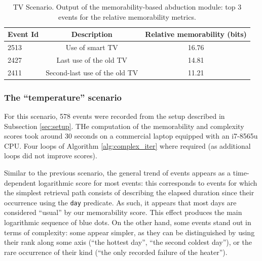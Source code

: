\documentclass[entropy,article,submit,moreauthors,pdftex]{Definitions/mdpi}
\begin{document}
\begin{table}
    \centering
    \begin{tabular}{l|c|c}
        Event Id & Description                   & Relative memorability (bits) \\
        \hline
        2513     & Use of smart TV               & 16.76                        \\
        2427     & Last use of the old TV        & 14.81                        \\
        2411     & Second-last use of the old TV & 11.21
    \end{tabular}
    \caption{TV Scenario. Output of the memorability-based abduction module: top 3 events for the relative memorability metrics.}
    \label{tab:abduction_res}
\end{table}

\subsubsection{The ``temperature'' scenario}

For this scenario, 578 events were recorded from the setup described in Subsection \ref{sec:setup}. THe computation of the memorability and complexity scores took around 30 seconds on a commercial laptop equipped with an i7-8565u CPU. Four loops of Algorithm \ref{alg:complex_iter} where required (as additional loops did not improve scores).

Similar to the previous scenario, the general trend of events appears as a time-dependent logarithmic score for most events: this corresponds to events for which the simplest retrieval path consists of describing the elapsed duration since their occurrence using the \texttt{day} predicate. As such, it appears that most days are considered ``usual'' by our memorability score. This effect produces the main logarithmic sequence of blue dots. On the other hand, some events stand out in terms of
complexity: some appear simpler, as they can be distinguished by using their
rank along some axis (``the hottest day'', ``the second coldest day''), or the rare occurrence of their kind (``the only recorded failure of the heater'').
\end{document}

